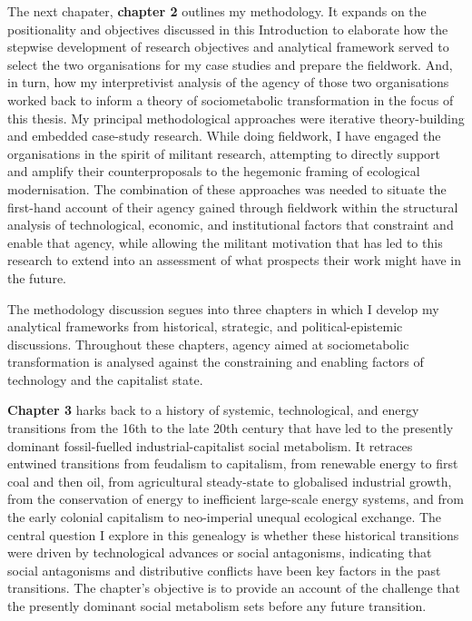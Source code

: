 \documentclass[a4paper, nobind]{templates/ociamthesis}
\begin{document}
The next chapater, \textbf{chapter 2} outlines my methodology. It expands on the positionality and objectives discussed in this Introduction to elaborate how the stepwise development of research objectives and analytical framework served to select the two organisations for my case studies and prepare the fieldwork. And, in turn, how my interpretivist analysis of the agency of those two organisations worked back to inform a theory of sociometabolic transformation in the focus of this thesis. My principal methodological approaches were iterative theory-building and embedded case-study research. While doing fieldwork, I have engaged the organisations in the spirit of militant research, attempting to directly support and amplify their counterproposals to the hegemonic framing of ecological modernisation. The combination of these approaches was needed to situate the first-hand account of their agency gained through fieldwork within the structural analysis of technological, economic, and institutional factors that constraint and enable that agency, while allowing the militant motivation that has led to this research to extend into an assessment of what prospects their work might have in the future.

The methodology discussion segues into three chapters in which I develop my analytical frameworks from historical, strategic, and political-epistemic discussions. Throughout these chapters, agency aimed at sociometabolic transformation is analysed against the constraining and enabling factors of technology and the capitalist state.

\textbf{Chapter 3} harks back to a history of systemic, technological, and energy transitions from the 16th to the late 20th century that have led to the presently dominant fossil-fuelled industrial-capitalist social metabolism. It retraces entwined transitions from feudalism to capitalism, from renewable energy to first coal and then oil, from agricultural steady-state to globalised industrial growth, from the conservation of energy to inefficient large-scale energy systems, and from the early colonial capitalism to neo-imperial unequal ecological exchange. The central question I explore in this genealogy is whether these historical transitions were driven by technological advances or social antagonisms, indicating that social antagonisms and distributive conflicts have been key factors in the past transitions. The chapter's objective is to provide an account of the challenge that the presently dominant social metabolism sets before any future transition.
\end{document}
